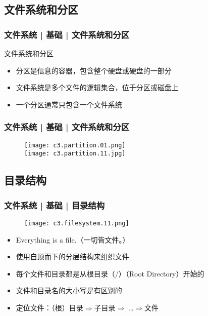 \subsection{文件系统和分区}
\begin{frame}
  \frametitle{文件系统 | 基础 | 文件系统和分区}
  \begin{block}{文件系统和分区}
    \begin{itemize}
      \item 分区是信息的容器，包含整个硬盘或硬盘的一部分
      \item 文件系统是多个文件的逻辑集合，位于分区或磁盘上
      \item 一个分区通常只包含一个文件系统
    \end{itemize}
  \end{block}
  \begin{figure}
    \centering
  \end{figure}
\end{frame}

\begin{frame}
  \frametitle{文件系统 | 基础 | 文件系统和分区}
  \begin{figure}
    \centering
    \texttt{[image: c3.partition.01.png]}\\
    \texttt{[image: c3.partition.11.jpg]}
  \end{figure}
\end{frame}

\subsection{目录结构}
\begin{frame}
  \frametitle{文件系统 | 基础 | \alert{目录结构}}
  \begin{figure}
    \centering
    \texttt{[image: c3.filesystem.11.png]}
  \end{figure}
  \pause
  \vspace{-0.3cm}
    \begin{itemize}[<+->]
      \item Everything is a file.（一切皆文件。）
      \item 使用自顶而下的分层结构来组织文件
      \item 每个文件和目录都是从根目录（/）（Root Directory）开始的
      \item 文件和目录名的大小写是有区别的
      \item 定位文件：（根）目录$\Rightarrow$子目录$\Rightarrow$ \ldots $\Rightarrow$文件
    \end{itemize}
\end{frame}

